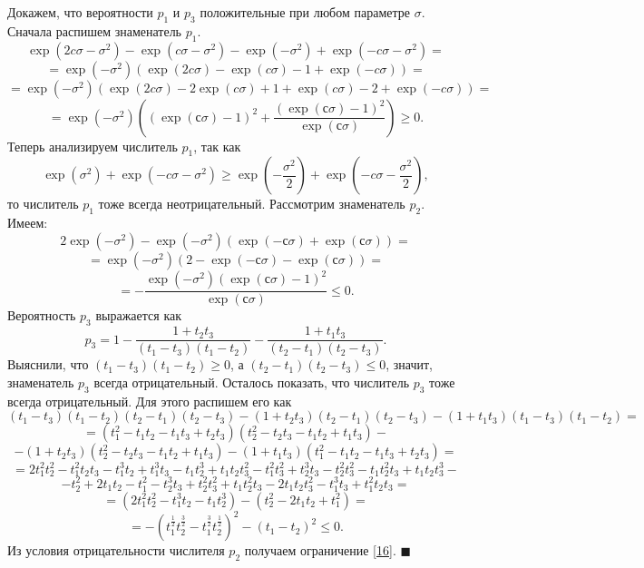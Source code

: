 \documentclass[12pt]{article}
\newenvironment{Proof}{\par\noindent{\bf Доказательство.}}{\hfill$\scriptstyle\blacksquare$}
\begin{document}
\begin{Proof}
		Докажем, что вероятности $p_{1}$ и $p_{3}$ положительные при любом параметре $\sigma$. Сначала распишем знаменатель $p_{1}$.
		\[\exp(2c\sigma-\sigma^{2})-\exp(c\sigma-\sigma^{2})-\exp(-\sigma^{2})+\exp(-c\sigma-\sigma^{2}) = \]
		\[=\exp(-\sigma^{2})(\exp(2c\sigma)-\exp(c\sigma)-1+\exp(-c\sigma))=\]
		\[=\exp(-\sigma^{2})(\exp(2c\sigma)-2\exp(c\sigma)+1+\exp(c\sigma)-2+\exp(-c\sigma))=\]
		\[=\exp(-\sigma^{2})\left( (\exp(с\sigma)-1)^{2}+\dfrac{(\exp(с\sigma)-1)^{2}}{\exp(с\sigma)}\right) \geq 0.\]
		Теперь анализируем числитель $p_{1}$, так как
		\[\exp(\sigma^{2})+\exp(-c\sigma-\sigma^{2})\geq \exp\left( -\dfrac{\sigma^{2}}{2}\right) +\exp\left( -c\sigma-\dfrac{\sigma^{2}}{2}\right),\]
		то числитель $p_{1}$ тоже всегда неотрицательный.
		Рассмотрим знаменатель $p_{2}$. Имеем:
		\[2\exp(-\sigma^{2})-\exp(-\sigma^{2})\left( \exp(-с\sigma)+\exp(с\sigma)\right)=\]
		\[=\exp(-\sigma^{2})(2- \exp(-с\sigma)-\exp(с\sigma))=\]
		\[=-\dfrac{\exp(-\sigma^{2})(\exp(с\sigma)-1)^{2}}{\exp(с\sigma)} \leq 0.\]
		Вероятность $p_{3}$ выражается как
		\[p_{3} = 1-\dfrac{1+t_{2}t_{3}}{(t_{1}-t_{3})(t_{1}-t_{2})}-\dfrac{1+t_{1}t_{3}}{(t_{2}-t_{1})(t_{2}-t_{3})}.\]
		Выяснили, что $(t_{1}-t_{3})(t_{1}-t_{2}) \geq 0$, а $(t_{2}-t_{1})(t_{2}-t_{3}) \leq 0$, значит, знаменатель $p_{3}$ всегда отрицательный. Осталось показать, что числитель $p_{3}$ тоже всегда отрицательный. Для этого распишем его как
		\[(t_{1}-t_{3})(t_{1}-t_{2})(t_{2}-t_{1})(t_{2}-t_{3})-(1+t_{2}t_{3})(t_{2}-t_{1})(t_{2}-t_{3})-(1+t_{1}t_{3})(t_{1}-t_{3})(t_{1}-t_{2})=\]
		\[=(t_{1}^{2}-t_{1}t_{2}-t_{1}t_{3}+t_{2}t_{3})(t_{2}^{2}-t_{2}t_{3}-t_{1}t_{2}+t_{1}t_{3})-\]
		\[-(1+t_{2}t_{3})(t_{2}^{2}-t_{2}t_{3}-t_{1}t_{2}+t_{1}t_{3})-(1+t_{1}t_{3})(t_{1}^{2}-t_{1}t_{2}-t_{1}t_{3}+t_{2}t_{3})=\]
		\[=2t_{1}^{2}t_{2}^{2}-t_{1}^{2}t_{2}t_{3}-t_{1}^{3}t_{2}+t_{1}^{3}t_{3}-t_{1}t_{2}^{3}+t_{1}t_{2}t_{3}^{2}-t_{1}^{2}t_{3}^{2}+t_{2}^{3}t_{3}-t_{2}^{2}t_{3}^{2}-t_{1}t_{2}^{2}t_{3}+t_{1}t_{2}t_{3}^{3}-\]
		\[-t_{2}^{2}+2t_{1}t_{2}-t_{1}^{2}-t_{2}^{3}t_{3}+t_{2}^{2}t_{3}^{2}+t_{1}t_{2}^{2}t_{3}-2t_{1}t_{2}t_{3}^{2}-t_{1}^{3}t_{3}+t_{1}^{2}t_{2}t_{3}=\]
		\[=(2t_{1}^{2}t_{2}^{2}-t_{1}^{3}t_{2}-t_{1}t_{2}^{3})-(t_{2}^{2}-2t_{1}t_{2}+t_{1}^{2})=\]
		\[=-(t_{1}^{\frac{1}{2}}t_{2}^{\frac{3}{2}}-t_{1}^{\frac{3}{2}}t_{2}^{\frac{1}{2}})^{2}-(t_{1}-t_{2})^{2} \leq 0.\]
		 Из условия отрицательности числителя $p_{2}$ получаем ограничение \eqref{16}.
	\end{Proof}
	
\end{document}
